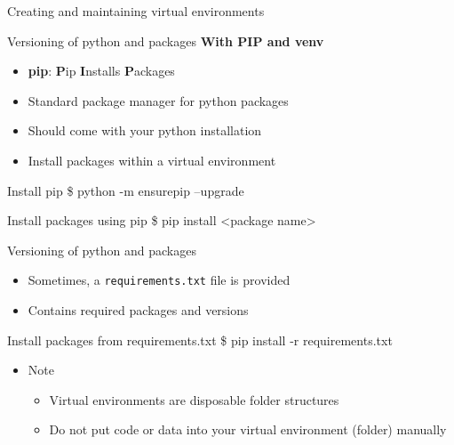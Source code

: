 \documentclass[10pt, aspectratio=169]{beamer}
\newcommand{\gemph}[1]{\textcolor{mzesgold}{#1}}
\begin{document}
{\begin{frame}{Creating and maintaining virtual environments}
  \end{frame}

  	\begin{frame}{Versioning of python and packages}
	\small
\textbf{With \gemph{PIP} and \gemph{venv}}
                \begin{itemize}
                    \item \textbf{pip}: \textbf{P}ip \textbf{I}nstalls \textbf{P}ackages
                    \item Standard package manager for python packages
                    \item Should come with your python installation
                    \item Install packages within a virtual environment
                \end{itemize}
                \begin{block}{Install \gemph{pip}}
                   \$ python -m ensurepip --upgrade
		          \end{block} 
                \begin{block}{Install packages using \gemph{pip}}
                   \$ pip install <package name>
		          \end{block} 
  \end{frame}

  	\begin{frame}{Versioning of python and packages}
	\small
                \begin{itemize}
                    \item Sometimes, a \texttt{requirements.txt} file is provided
                    \item Contains required packages and versions
                \end{itemize}
                \begin{block}{Install packages from \gemph{requirements.txt}}
                   \$ pip install -r requirements.txt
		          \end{block} 
            \begin{itemize}
                \item Note
                \begin{itemize}
                    \item Virtual environments are disposable folder structures
                \item Do not put code or data into your virtual environment (folder) manually
                \end{itemize}
            \end{itemize}
  \end{frame}





}
\end{document}
